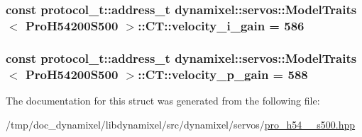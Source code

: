 \subsubsection[{velocity\+\_\+i\+\_\+gain}]{\setlength{\rightskip}{0pt plus 5cm}const {\bf protocol\+\_\+t\+::address\+\_\+t} {\bf dynamixel\+::servos\+::\+Model\+Traits}$<$ {\bf Pro\+H54200\+S500} $>$\+::C\+T\+::velocity\+\_\+i\+\_\+gain = 586\hspace{0.3cm}{\ttfamily [static]}}\label{structdynamixel_1_1servos_1_1_model_traits_3_01_pro_h54200_s500_01_4_1_1_c_t_adfb12b9744b9bb6fc65a210d1be39cb3}
\hypertarget{structdynamixel_1_1servos_1_1_model_traits_3_01_pro_h54200_s500_01_4_1_1_c_t_ad163da4ef43e286d9d4af9fd4a4ccf71}{}
\subsubsection[{velocity\+\_\+p\+\_\+gain}]{\setlength{\rightskip}{0pt plus 5cm}const {\bf protocol\+\_\+t\+::address\+\_\+t} {\bf dynamixel\+::servos\+::\+Model\+Traits}$<$ {\bf Pro\+H54200\+S500} $>$\+::C\+T\+::velocity\+\_\+p\+\_\+gain = 588\hspace{0.3cm}{\ttfamily [static]}}\label{structdynamixel_1_1servos_1_1_model_traits_3_01_pro_h54200_s500_01_4_1_1_c_t_ad163da4ef43e286d9d4af9fd4a4ccf71}


The documentation for this struct was generated from the following file\+:\begin{DoxyCompactItemize}
\item 
/tmp/doc\+\_\+dynamixel/libdynamixel/src/dynamixel/servos/\hyperlink{pro__h54__200__s500_8hpp}{pro\+\_\+h54\+\_\+\_\+s500.\+hpp}\end{DoxyCompactItemize}
